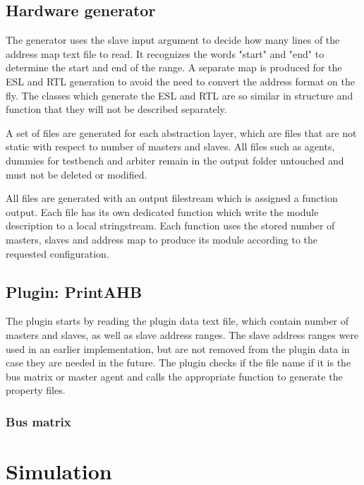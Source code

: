 \subsection{Hardware generator}
The generator uses the slave input argument to decide how many lines of the address map text file to read. It recognizes the words "start" and "end" to determine the start and end of the range. A separate map is produced for the ESL and RTL generation to avoid the need to convert the address format on the fly. The classes which generate the ESL and RTL are so similar in structure and function that they will not be described separately. \par
A set of files are generated for each abstraction layer, which are files that are not static with respect to number of masters and slaves. All files such as agents, dummies for testbench and arbiter remain in the output folder untouched and must not be deleted or modified. \par
All files are generated with an output filestream which is assigned a function output. Each file has its own dedicated function which write the module description to a local stringstream. Each function uses the stored number of masters, slaves and address map to produce its module according to the requested configuration. 

\subsection{Plugin: PrintAHB}
The plugin starts by reading the plugin data text file, which contain number of masters and slaves, as well as slave address ranges. The slave address ranges were used in an earlier implementation, but are not removed from the plugin data in case they are needed in the future. The plugin checks if the file name if it is the bus matrix or master agent and calls the appropriate function to generate the property files. 
\subsubsection{Bus matrix}



\section{Simulation}



